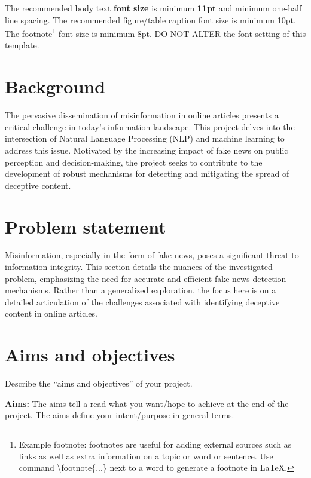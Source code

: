 The recommended body text \textbf{font size} is minimum \textbf{11pt} and minimum one-half line spacing. The recommended figure/table caption font size is minimum 10pt. The footnote\footnote{Example footnote: footnotes are useful for adding external sources such as links as well as extra information on a topic or word or sentence. Use command \textbackslash footnote\{...\} next to a word to generate a footnote in \LaTeX.} font size is minimum 8pt. DO NOT ALTER the font setting of this template.   

\section{Background}
\label{sec:into_back}
The pervasive dissemination of misinformation in online articles presents a critical challenge in today's information landscape. This project delves into the intersection of Natural Language Processing (NLP) and machine learning to address this issue. Motivated by the increasing impact of fake news on public perception and decision-making, the project seeks to contribute to the development of robust mechanisms for detecting and mitigating the spread of deceptive content. 

\section{Problem statement}
\label{sec:intro_prob_art}
Misinformation, especially in the form of fake news, poses a significant threat to information integrity. This section details the nuances of the investigated problem, emphasizing the need for accurate and efficient fake news detection mechanisms. Rather than a generalized exploration, the focus here is on a detailed articulation of the challenges associated with identifying deceptive content in online articles. 

\section{Aims and objectives}
\label{sec:intro_aims_obj}
Describe the ``aims and objectives'' of your project. 

\textbf{Aims:} The aims tell a read what you want/hope to achieve at the end of the project. The  aims define your intent/purpose in general terms.  

